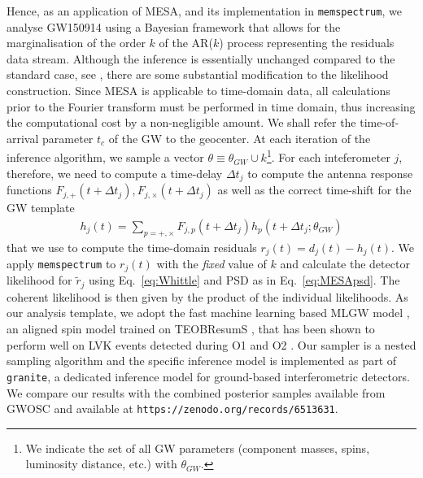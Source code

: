 \documentclass[epj,nopacs]{svjour}
\begin{document}
Hence, as an application of MESA, and its implementation in \texttt{memspectrum}, we analyse GW150914\cite{gw150914} using a Bayesian framework that allows for the marginalisation of the order  $k$ of the AR($k$) process representing the residuals data stream. Although the inference is essentially unchanged compared to the standard case, see \cite{lalinference}, there are some substantial modification to the likelihood construction. Since MESA is applicable to time-domain data, all calculations prior to the Fourier transform must be performed in time domain, thus increasing the computational cost by a non-negligible amount. We shall refer the time-of-arrival parameter $t_c$ of the GW to the geocenter. At each iteration of the inference algorithm, we sample a vector $\theta\equiv\theta_{GW}\cup k$\footnote{We indicate the set of all GW parameters (component masses, spins, luminosity distance, etc.) with $\theta_{GW}$.}. For each inteferometer $j$, therefore, we need to compute a time-delay $\Delta t_j$ to compute the antenna response functions $F_{j,+}(t+\Delta t_j),F_{j,\times}(t+\Delta t_j)$ as well as the correct time-shift for the GW template 
\begin{align}
h_j(t) =\sum_{p = +,\times}F_{j,p}(t+\Delta t_j)h_{p}(t+\Delta t_j;\theta_{GW})
\end{align}
that we use to compute the time-domain residuals $r_j(t) = d_j(t) - h_j(t)$. We apply \texttt{memspectrum} to $r_j(t)$ with the \emph{fixed} value of $k$ and calculate the detector likelihood for $\tilde{r}_j$ using Eq.~\eqref{eq:Whittle} and PSD as in Eq.~\eqref{eq:MESApsd}. The coherent likelihood is then given by the product of the individual likelihoods. As our analysis template, we adopt the fast machine learning based MLGW model \cite{MLGW}, an aligned spin model trained on TEOBResumS \cite{teobresums}, that has been shown to perform well on LVK events detected during O1 and O2 \cite{MLGW}. Our sampler is a nested sampling algorithm \cite{john_veitch_2020_4109277} and the specific inference model is implemented as part of \texttt{granite}, a dedicated inference model for ground-based interferometric detectors. We compare our results with the combined posterior samples available from GWOSC \cite{GWOSC} and available at \linebreak
\texttt{https://zenodo.org/records/6513631}.
\end{document}
